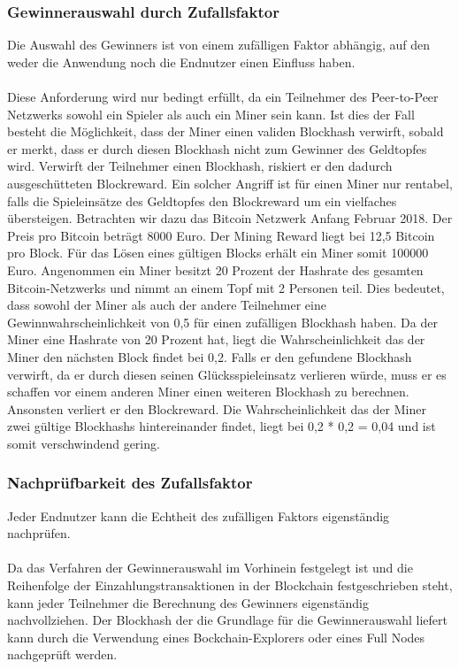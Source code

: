\subsubsection{Gewinnerauswahl durch Zufallsfaktor}
Die Auswahl des Gewinners ist von einem zufälligen Faktor abhängig, auf den weder die Anwendung noch die Endnutzer einen Einfluss haben.\\\\
Diese Anforderung wird nur bedingt erfüllt, da ein Teilnehmer des Peer-to-Peer Netzwerks sowohl ein Spieler als auch ein Miner sein kann. Ist dies der Fall besteht die Möglichkeit, dass der Miner einen validen Blockhash verwirft, sobald er merkt, dass er durch diesen Blockhash nicht zum Gewinner des Geldtopfes wird. Verwirft der Teilnehmer einen Blockhash, riskiert er den dadurch ausgeschütteten Blockreward. Ein solcher Angriff ist für einen Miner nur rentabel, falls die Spieleinsätze des Geldtopfes den Blockreward um ein vielfaches übersteigen.
Betrachten wir dazu das Bitcoin Netzwerk Anfang Februar 2018. Der Preis pro Bitcoin beträgt 8000 Euro. Der Mining Reward liegt bei 12,5 Bitcoin pro Block. Für das Lösen eines gültigen Blocks erhält ein Miner somit 100000 Euro. Angenommen ein Miner besitzt 20 Prozent der Hashrate des gesamten Bitcoin-Netzwerks und nimmt an einem Topf mit 2 Personen teil. Dies bedeutet, dass sowohl der Miner als auch der andere Teilnehmer eine Gewinnwahrscheinlichkeit von 0,5 für einen zufälligen Blockhash haben.
Da der Miner eine Hashrate von 20 Prozent hat, liegt die Wahrscheinlichkeit das der Miner den nächsten Block findet bei 0,2. Falls er den gefundene Blockhash verwirft, da er durch diesen seinen Glücksspieleinsatz verlieren würde, muss er es schaffen vor einem anderen Miner einen weiteren Blockhash zu berechnen. Ansonsten verliert er den Blockreward. Die Wahrscheinlichkeit das der Miner zwei gültige Blockhashs hintereinander findet, liegt bei 0,2 * 0,2 = 0,04 und ist somit verschwindend gering.

\subsubsection{Nachprüfbarkeit des Zufallsfaktor}
Jeder Endnutzer kann die Echtheit des zufälligen Faktors eigenständig nachprüfen.\\\\
Da das Verfahren der Gewinnerauswahl im Vorhinein festgelegt ist und die Reihenfolge der Einzahlungstransaktionen in der Blockchain festgeschrieben steht, kann jeder Teilnehmer die Berechnung des Gewinners eigenständig nachvollziehen. Der Blockhash der die Grundlage für die Gewinnerauswahl liefert kann durch die Verwendung eines Bockchain-Explorers oder eines Full Nodes nachgeprüft werden. 
